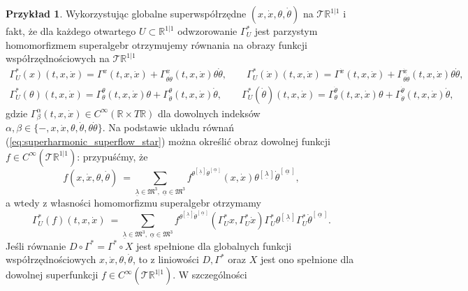 \documentclass[11pt,a4paper]{report}
\theoremstyle{definition}
\newtheorem{example}[theorem]{Przykład}
\begin{document}
\begin{example}
Wykorzystując globalne superwspółrzędne $(x, \dot x, \theta, \dot \theta)$ na $\mathcal{T} \mathbb{R}^{1|1}$ i fakt, że dla każdego otwartego $U\subset \mathbb{R}^{1|1}$ odwzorowanie $\Gamma^*_U$ jest parzystym homomorfizmem superalgebr otrzymujemy równania na obrazy funkcji współrzędnościowych na $\mathcal{T} \mathbb{R}^{1|1}$
\begin{equation}
\label{eq:superharmonic_superflow_star}
\begin{gathered}
\Gamma_U^*(x) (t,x,\dot x) =\Gamma^x(t,x,\dot x)+\Gamma^x_{\theta\dot\theta}(t,x,\dot x)\theta\dot\theta,\qquad 
\Gamma_U^*(\dot x) (t,x,\dot x) =\Gamma^{\dot x}(t,x,\dot x)+\Gamma^{\dot x}_{\theta\dot\theta}(t,x,\dot x)\theta\dot\theta, \\
\Gamma_U^*(\theta) (t,x,\dot x) =\Gamma^\theta_\theta(t,x,\dot x) \theta+\Gamma^\theta_{\dot\theta}(t,x,\dot x) \dot \theta,\qquad
\Gamma_U^*(\dot\theta) (t,x,\dot x) =\Gamma^{\dot \theta}_\theta(t,x,\dot x) \theta+\Gamma^{\dot \theta}_{\dot\theta}(t,x,\dot x) \dot \theta,
\end{gathered}
\end{equation}
gdzie $\Gamma^\alpha_\beta (t,x,\dot x) \in C^\infty (\mathbb{R}\times T \mathbb{R})$ dla dowolnych indeksów $\alpha, \beta \in \{ - ,x, \dot x, \theta, \dot \theta, \theta \dot \theta \}$. Na podstawie układu równań (\ref{eq:superharmonic_superflow_star}) można określić obraz dowolnej funkcji $f \in C^\infty(\mathcal{T} \mathbb{R}^{1|1})$: przypuśćmy, że $$f(x, \dot x, \theta, \dot \theta)\ = \!\!\!\!\!\!\!\!
  \sum_{\underline{\lambda} \in \mathfrak{M}^3,\; \underline{\alpha} \in \mathfrak{M}^3} \!\!\!\!\!\!\!\! f^{\theta^{\left[\, \underline{\lambda}\, \right]} \dot \theta^{\left[\, \underline{\alpha}\, \right]}} (x, \dot x) \theta^{\left[\, \underline{\lambda}\, \right]} \dot \theta^{\left[\, \underline{\alpha}\, \right]},$$
a wtedy z własności homomorfizmu superalgebr otrzymamy
\begin{equation*}
\Gamma_U^* (f) (t,x, \dot x)\ = \!\!\!\!\!\!\!\!
  \sum_{\underline{\lambda} \in \mathfrak{M}^3,\; \underline{\alpha} \in \mathfrak{M}^3} \!\!\!\!\!\!\!\! f^{\theta^{\left[\, \underline{\lambda}\, \right]} \dot \theta^{\left[\, \underline{\alpha}\, \right]}} (\Gamma^*_U x, \Gamma^*_U \dot x) \Gamma^*_U \theta^{\left[\, \underline{\lambda}\, \right]} \Gamma^*_U \dot \theta^{\left[\, \underline{\alpha}\, \right]}.
\end{equation*}
Jeśli równanie $D \circ \Gamma^* = \Gamma^* \circ X$ jest spełnione dla globalnych funkcji współrzędnościowych $x, \dot x, \theta, \dot \theta$, to z liniowości $D, \Gamma^*$ oraz $X$ jest ono spełnione dla dowolnej superfunkcji $f \in C^\infty (\mathcal{T} \mathbb{R}^{1|1})$. W szczególności \\[-7pt]

\end{example}
\end{document}
